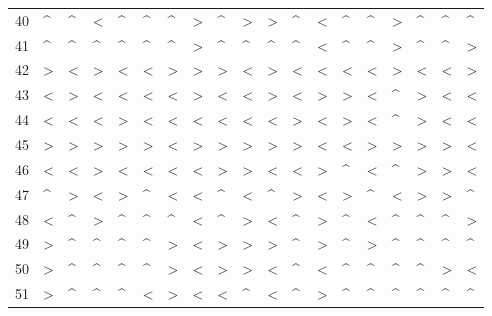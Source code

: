 \begin{tabular}{lllllllllllllllllll}
40  &  \textasciicircum  &  \textasciicircum  &  < &  \textasciicircum  &  \textasciicircum  &  \textasciicircum  &  > &  \textasciicircum  &  > &  > &  \textasciicircum  &  < &  \textasciicircum  &  \textasciicircum  &  > &  \textasciicircum  &  \textasciicircum  &  \textasciicircum  \\
41  &  \textasciicircum  &  \textasciicircum  &  \textasciicircum  &  \textasciicircum  &  \textasciicircum  &  \textasciicircum  &  > &  \textasciicircum  &  \textasciicircum  &  \textasciicircum  &  \textasciicircum  &  < &  \textasciicircum  &  \textasciicircum  &  > &  \textasciicircum  &  \textasciicircum  &  > \\
42  &  > &  < &  > &  < &  < &  > &  > &  > &  < &  > &  < &  < &  < &  < &  > &  < &  < &  > \\
43  &  < &  > &  < &  < &  < &  < &  > &  < &  < &  > &  < &  > &  > &  < &  \textasciicircum  &  > &  < &  < \\
44  &  < &  < &  < &  > &  < &  < &  < &  < &  < &  < &  > &  < &  > &  < &  \textasciicircum  &  > &  < &  < \\
45  &  > &  > &  > &  > &  > &  < &  > &  > &  > &  > &  > &  < &  < &  > &  > &  > &  > &  < \\
46  &  < &  < &  > &  < &  < &  < &  < &  > &  > &  < &  < &  > &  \textasciicircum  &  < &  \textasciicircum  &  > &  > &  < \\
47  &  \textasciicircum  &  > &  < &  > &  \textasciicircum  &  < &  < &  \textasciicircum  &  < &  \textasciicircum  &  > &  < &  > &  \textasciicircum  &  < &  > &  > &  \textasciicircum  \\
48  &  < &  \textasciicircum  &  > &  \textasciicircum  &  \textasciicircum  &  \textasciicircum  &  < &  \textasciicircum  &  > &  < &  \textasciicircum  &  > &  \textasciicircum  &  < &  \textasciicircum  &  \textasciicircum  &  \textasciicircum  &  > \\
49  &  > &  \textasciicircum  &  \textasciicircum  &  \textasciicircum  &  \textasciicircum  &  > &  < &  > &  > &  > &  \textasciicircum  &  > &  \textasciicircum  &  > &  \textasciicircum  &  \textasciicircum  &  \textasciicircum  &  \textasciicircum  \\
50  &  > &  \textasciicircum  &  \textasciicircum  &  \textasciicircum  &  \textasciicircum  &  > &  < &  > &  > &  < &  \textasciicircum  &  < &  \textasciicircum  &  \textasciicircum  &  \textasciicircum  &  \textasciicircum  &  > &  < \\
51  &  > &  \textasciicircum  &  \textasciicircum  &  \textasciicircum  &  < &  > &  < &  < &  \textasciicircum  &  < &  \textasciicircum  &  > &  \textasciicircum  &  \textasciicircum  &  \textasciicircum  &  \textasciicircum  &  \textasciicircum  &  \textasciicircum  \\

\end{tabular}
